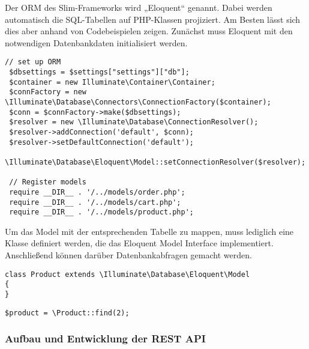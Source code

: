 Der ORM des Slim-Frameworks wird „Eloquent“ genannt. Dabei werden automatisch die SQL-Tabellen auf PHP-Klassen projiziert. Am Besten lässt sich dies aber anhand von Codebeispielen zeigen.
Zunächst muss Eloquent mit den notwendigen Datenbankdaten initialisiert werden.
\lstset{language=PHP}  
\begin{lstlisting}[frame=single, breaklines=true] 
// set up ORM
 $dbsettings = $settings["settings"]["db"];
 $container = new Illuminate\Container\Container;
 $connFactory = new \Illuminate\Database\Connectors\ConnectionFactory($container);
 $conn = $connFactory->make($dbsettings);
 $resolver = new \Illuminate\Database\ConnectionResolver();
 $resolver->addConnection('default', $conn);
 $resolver->setDefaultConnection('default');
 \Illuminate\Database\Eloquent\Model::setConnectionResolver($resolver);
 
 // Register models
 require __DIR__ . '/../models/order.php';
 require __DIR__ . '/../models/cart.php';
 require __DIR__ . '/../models/product.php';
\end{lstlisting}

Um das Model mit der entsprechenden Tabelle zu mappen, muss lediglich eine Klasse definiert werden, die das Eloquent Model Interface implementiert. Anschließend können darüber Datenbankabfragen gemacht werden.
\begin{lstlisting}[frame=single] 
class Product extends \Illuminate\Database\Eloquent\Model
{
}
\end{lstlisting}
\begin{lstlisting}[frame=single] 
 $product = \Product::find(2);
\end{lstlisting}

\subsubsection{Aufbau und Entwicklung der REST API}  
\label{sec:Aufbau und Entwicklung der REST API-1}
